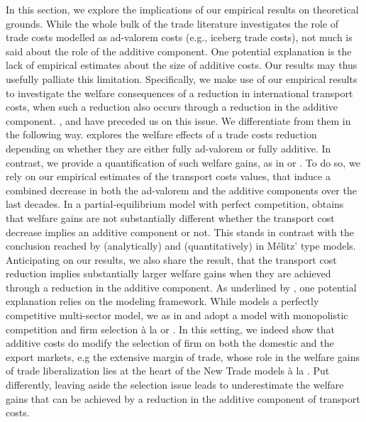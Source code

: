 \documentclass[a4paper,11pt]{article}
\begin{document}
In this section, we explore the implications of our empirical results on theoretical grounds. While the whole bulk of the trade literature investigates the role of trade costs modelled as ad-valorem costs (e.g., iceberg trade costs), not much is said about the role of the additive component. One potential explanation is the lack of empirical estimates about the size of additive costs. Our results may thus usefully palliate this limitation. Specifically, we make use of our empirical results to investigate the welfare consequences of a reduction in international transport costs, when such a reduction also occurs through a reduction in the additive component. \cite{Irrazabal_2015}, \cite{sorensen2014} and \cite{Lashkaripour_JIE2020} have preceded us on this issue. We differentiate from them in the following way. \cite{sorensen2014} explores the welfare effects of a trade costs reduction depending on whether they are either fully ad-valorem or fully additive. In contrast, we provide a quantification of such welfare gains, as in \cite{Irrazabal_2015} or \cite{Lashkaripour_JIE2020}. To do so, we rely on our empirical estimates of the transport costs values, that induce a combined decrease in both the ad-valorem and the additive components over the last decades. In a partial-equilibrium model with perfect competition, \cite{Lashkaripour_JIE2020} obtains that welfare gains are not substantially different whether the transport cost decrease implies an additive component or not. This stands in contrast with the conclusion reached by \cite{sorensen2014} (analytically) and \cite{Irrazabal_2015} (quantitatively) in M\'{e}litz' type models. Anticipating on our results, we also share the result, that the transport cost reduction implies substantially larger welfare gains when they are achieved through a reduction in the additive component. As underlined by \cite{Lashkaripour_JIE2020}, one potential explanation relies on the modeling framework. While \cite{Lashkaripour_JIE2020} models a perfectly competitive multi-sector model, we as in \cite{sorensen2014} and \cite{Irrazabal_2015} adopt a model with monopolistic competition and firm selection \`{a} la \cite{melitz} or \cite{chaney2008}. In this setting, we indeed show that additive costs do modify the selection of firm on both the domestic and the export markets, e.g the extensive margin of trade, whose role in the welfare gains of trade liberalization lies at the heart of the New Trade models  \`{a} la \cite{melitz}. Put differently, leaving aside the selection issue leads to underestimate the welfare gains that can be achieved by a reduction in the additive component of transport costs.
\end{document}
